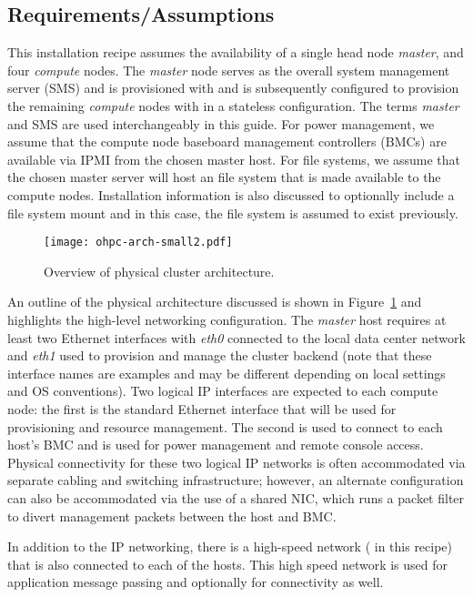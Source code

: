 \subsection{Requirements/Assumptions}
This installation recipe assumes the availability of a single head node {\em
  master}, and four {\em compute} nodes. The {\em master} node serves as the
overall system management server (SMS) and is provisioned with \baseOS{} and is
subsequently configured to provision the remaining {\em compute} nodes with
\Warewulf{} in a stateless configuration. The terms {\em master} and SMS are
used interchangeably in this guide. For power management, we assume that
the compute node baseboard management controllers (BMCs) are available via IPMI
from the chosen master host. For file systems, we assume that the chosen master
server will host an \NFS{} file system that is made available to the compute
nodes. Installation information is also discussed to optionally include a
\Lustre{} file system mount and in this case, the \Lustre{} file system is
assumed to exist previously.

\begin{figure}[hbt]
\center
\texttt{[image: ohpc-arch-small2.pdf]}
\vspace*{-0.2cm}
\caption{Overview of physical cluster architecture.} \label{fig:physical_arch}
\end{figure}
\mbox{}

An outline of the physical architecture discussed is shown in
Figure~\ref{fig:physical_arch} and highlights the high-level networking
configuration. The {\em master} host requires at least two Ethernet interfaces
with {\em eth0} connected to the local data center network and {\em eth1} used
to provision and manage the cluster backend (note that these interface names
are examples and may be different depending on local settings and OS
conventions).  Two logical IP interfaces are expected to each compute node: the
first is the standard Ethernet interface that will be used for provisioning and
resource management. The second is used to connect to each host's BMC and is
used for power management and remote console access. Physical connectivity for
these two logical IP networks is often accommodated via separate cabling and
switching infrastructure; however, an alternate configuration can also be
accommodated via the use of a shared NIC, which runs a packet filter to divert
management packets between the host and BMC.

 In addition to the IP networking, there is a high-speed network
(\InfiniBand{} in this recipe) that is also connected to each of the
hosts. This high speed network is used for application message passing and
optionally for \Lustre{} connectivity as well.

